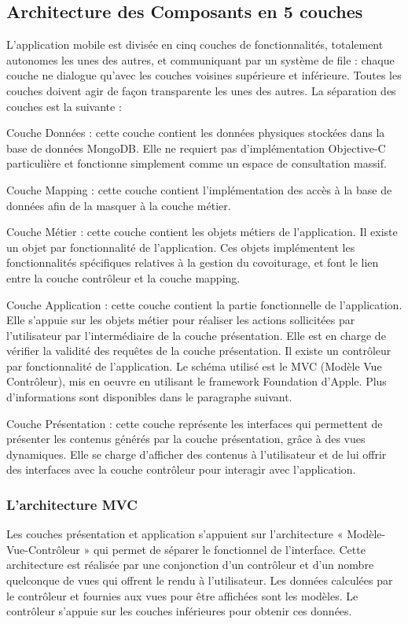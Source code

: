 \documentclass[a4paper,12pt]{report}
\begin{document}
\begin{onehalfspace}
\section{Architecture des Composants en 5 couches} %
\label{sec:architecture_des_composants_en_5_couches}

L’application mobile est divisée en cinq couches de fonctionnalités, totalement autonomes les unes des autres, et communiquant par un système de file : chaque couche ne dialogue qu’avec les couches voisines supérieure et inférieure. Toutes les couches doivent agir de façon transparente les unes des autres. La séparation des couches est la suivante :

Couche Données : cette couche contient les données physiques stockées dans la base de données MongoDB. Elle ne requiert pas d’implémentation Objective-C particulière et fonctionne simplement comme un espace de consultation massif.

Couche Mapping : cette couche contient l’implémentation des accès à la base de données afin de la masquer à la couche métier.

Couche Métier : cette couche contient les objets métiers de l’application. Il existe un objet par fonctionnalité de l’application. Ces objets implémentent les fonctionnalités spécifiques relatives à la gestion du covoiturage, et font le lien entre la couche contrôleur et la couche mapping.

Couche Application : cette couche contient la partie fonctionnelle de l’application. Elle s’appuie sur les objets métier pour réaliser les actions sollicitées par l’utilisateur par l’intermédiaire de la couche présentation. Elle est en charge de vérifier la validité des requêtes de la couche présentation. Il existe un contrôleur par fonctionnalité de l’application. Le schéma utilisé est le MVC (Modèle Vue Contrôleur), mis en oeuvre en utilisant le framework Foundation d'Apple. Plus d’informations sont disponibles dans le paragraphe suivant.

Couche Présentation : cette couche représente les interfaces qui permettent de présenter les contenus générés par la couche présentation, grâce à des vues dynamiques. Elle se charge d’afficher des contenus à l’utilisateur et de lui offrir des interfaces avec la couche contrôleur pour interagir avec l’application.

\subsubsection{L'architecture MVC} %
\label{ssub:l_architecture_mvc}
Les couches présentation et application s’appuient  sur l’architecture « Modèle-Vue-Contrôleur » qui permet de séparer le fonctionnel de l’interface. Cette architecture est réalisée par une conjonction d’un contrôleur et d’un nombre quelconque de vues qui offrent le rendu à l’utilisateur. Les données calculées par le contrôleur et fournies aux vues pour être affichées sont les modèles. Le contrôleur s’appuie  sur les couches inférieures pour obtenir ces données.


\end{onehalfspace}
\end{document}
